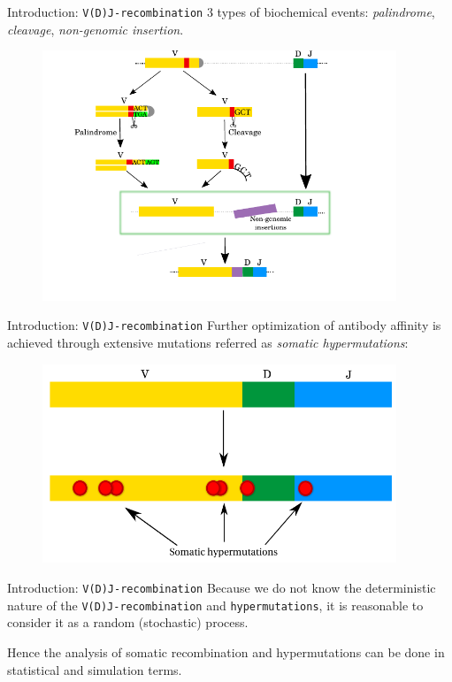 \documentclass{beamer}\usepackage[]{graphicx}\usepackage[]{color}
\begin{document}
\begin{frame}{Introduction: \texttt{V(D)J-recombination}}
  3 types of biochemical events: \textit{palindrome}, \textit{cleavage}, \textit{non-genomic insertion}. 
  \begin{figure}[h]
    \center\includegraphics[width=300pt]{Pictures/vdj3_DJ_aligned_new.pdf}
 \end{figure}
\end{frame}

\begin{frame}{Introduction: \texttt{V(D)J-recombination}}
  Further optimization of antibody affinity is achieved through extensive mutations referred as \textit{somatic hypermutations}:
  \begin{figure}[h]
    \center\includegraphics[width=300pt]{Pictures/somatic_mutations.pdf}
 \end{figure}
\end{frame}

\begin{frame}{Introduction: \texttt{V(D)J-recombination}}
    Because we do not know the deterministic nature of the \texttt{V(D)J-recombination} and \texttt{hypermutations}, it is reasonable
  to consider it as a {\color{blue} random} (stochastic) process.

  \bigskip
  Hence the analysis of somatic recombination and hypermutations can be done in statistical and simulation terms. 
\end{frame}
\end{document}
